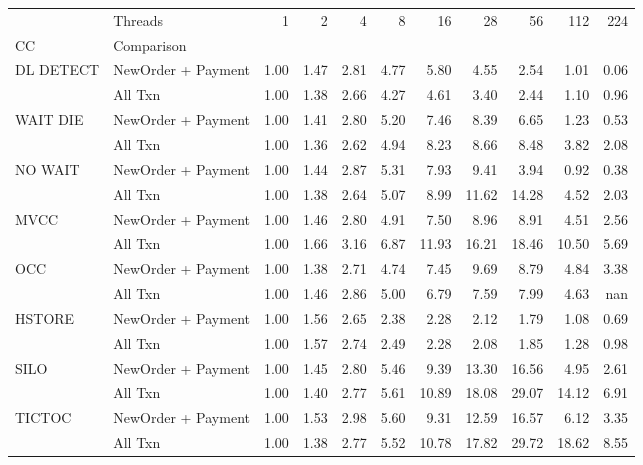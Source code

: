 \begin{tabular}{llrrrrrrrrr}
\toprule
       & Threads &  1   &  2   &  4   &  8   &   16  &   28  &   56  &   112 &  224 \\
CC & Comparison &      &      &      &      &       &       &       &       &      \\
\midrule
DL DETECT & NewOrder + Payment & 1.00 & 1.47 & 2.81 & 4.77 &  5.80 &  4.55 &  2.54 &  1.01 & 0.06 \\
       & All Txn & 1.00 & 1.38 & 2.66 & 4.27 &  4.61 &  3.40 &  2.44 &  1.10 & 0.96 \\
WAIT DIE & NewOrder + Payment & 1.00 & 1.41 & 2.80 & 5.20 &  7.46 &  8.39 &  6.65 &  1.23 & 0.53 \\
       & All Txn & 1.00 & 1.36 & 2.62 & 4.94 &  8.23 &  8.66 &  8.48 &  3.82 & 2.08 \\
NO WAIT & NewOrder + Payment & 1.00 & 1.44 & 2.87 & 5.31 &  7.93 &  9.41 &  3.94 &  0.92 & 0.38 \\
       & All Txn & 1.00 & 1.38 & 2.64 & 5.07 &  8.99 & 11.62 & 14.28 &  4.52 & 2.03 \\
MVCC & NewOrder + Payment & 1.00 & 1.46 & 2.80 & 4.91 &  7.50 &  8.96 &  8.91 &  4.51 & 2.56 \\
       & All Txn & 1.00 & 1.66 & 3.16 & 6.87 & 11.93 & 16.21 & 18.46 & 10.50 & 5.69 \\
OCC & NewOrder + Payment & 1.00 & 1.38 & 2.71 & 4.74 &  7.45 &  9.69 &  8.79 &  4.84 & 3.38 \\
       & All Txn & 1.00 & 1.46 & 2.86 & 5.00 &  6.79 &  7.59 &  7.99 &  4.63 &  nan \\
HSTORE & NewOrder + Payment & 1.00 & 1.56 & 2.65 & 2.38 &  2.28 &  2.12 &  1.79 &  1.08 & 0.69 \\
       & All Txn & 1.00 & 1.57 & 2.74 & 2.49 &  2.28 &  2.08 &  1.85 &  1.28 & 0.98 \\
SILO & NewOrder + Payment & 1.00 & 1.45 & 2.80 & 5.46 &  9.39 & 13.30 & 16.56 &  4.95 & 2.61 \\
       & All Txn & 1.00 & 1.40 & 2.77 & 5.61 & 10.89 & 18.08 & 29.07 & 14.12 & 6.91 \\
TICTOC & NewOrder + Payment & 1.00 & 1.53 & 2.98 & 5.60 &  9.31 & 12.59 & 16.57 &  6.12 & 3.35 \\
       & All Txn & 1.00 & 1.38 & 2.77 & 5.52 & 10.78 & 17.82 & 29.72 & 18.62 & 8.55 \\
\bottomrule
\end{tabular}
